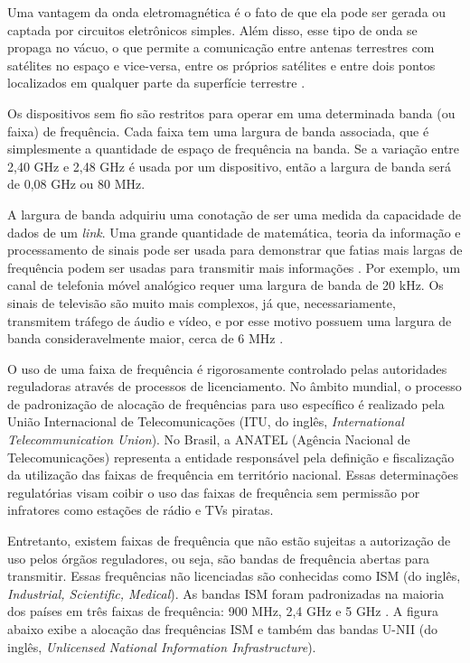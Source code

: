 Uma vantagem da onda eletromagnética é o fato de que ela pode ser gerada ou captada por circuitos eletrônicos simples. Além disso, esse tipo de onda se propaga no vácuo, o que permite a comunicação entre antenas terrestres com satélites no espaço e vice-versa, entre os próprios satélites e entre dois pontos localizados em qualquer parte da superfície terrestre \cite{fluminense2010}.

Os dispositivos sem fio são restritos para operar em uma determinada banda (ou faixa) de frequência. Cada faixa tem uma largura de banda associada, que é simplesmente a quantidade de espaço de frequência na banda. Se a variação entre 2,40 GHz e 2,48 GHz é usada por um dispositivo, então a largura de banda será de 0,08 GHz ou 80 MHz.

A largura de banda adquiriu uma conotação de ser uma medida da capacidade de dados de um \textit{link}. Uma grande quantidade de matemática, teoria da informação e processamento de sinais pode ser usada para demonstrar que fatias mais largas de frequência podem ser usadas para transmitir mais informações \cite{gast2002}. Por exemplo, um canal de telefonia móvel analógico requer uma largura de banda de 20 kHz. Os sinais de televisão são muito mais complexos, já que, necessariamente, transmitem tráfego de áudio e vídeo, e por esse motivo possuem uma largura de banda consideravelmente maior, cerca de 6 MHz \cite{gast2002}.

O uso de uma faixa de frequência é rigorosamente controlado pelas autoridades reguladoras através de processos de licenciamento. No âmbito mundial, o processo de padronização de alocação de frequências para uso específico é realizado pela União Internacional de Telecomunicações (ITU, do inglês, \textit{International Telecommunication Union}). No Brasil, a ANATEL (Agência Nacional de Telecomunicações) representa a entidade responsável pela definição e fiscalização da utilização das faixas de frequência em território nacional. Essas determinações regulatórias visam coibir o uso das faixas de frequência sem permissão por infratores como estações de rádio e TVs piratas.

Entretanto, existem faixas de frequência que não estão sujeitas a autorização de uso pelos órgãos reguladores, ou seja, são bandas de frequência abertas para transmitir. Essas frequências não licenciadas são conhecidas como ISM (do inglês, \textit{Industrial, Scientific, Medical}). As bandas ISM foram padronizadas na maioria dos países em três faixas de frequência: 900 MHz, 2,4 GHz e 5 GHz \cite{moraes2010,tanenbaum2011}. A figura abaixo exibe a alocação das frequências ISM e também das bandas U-NII (do inglês, \textit{Unlicensed National Information Infrastructure}).

